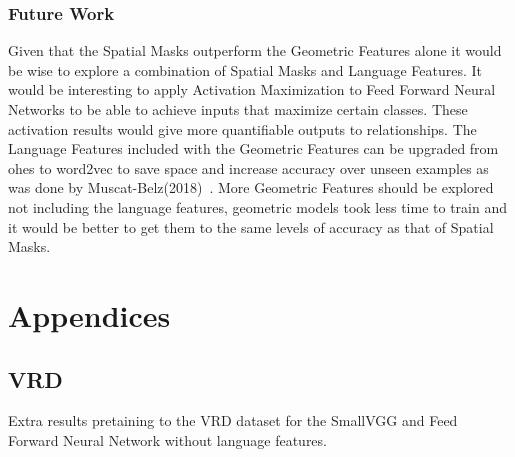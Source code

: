 \documentclass{csfyp}
\begin{document}
\subsubsection{Future Work}
Given that the Spatial Masks outperform the Geometric Features alone it would be wise to explore a combination of Spatial Masks and Language Features. It would be interesting to apply Activation Maximization to Feed Forward Neural Networks to be able to achieve inputs that maximize certain classes. These activation results would give more quantifiable outputs to relationships. The Language Features included with the Geometric Features can be upgraded from \Gls{ohe}s to word2vec to save space and increase accuracy over unseen examples as was done by Muscat-Belz(2018)~\cite{belz-etal-2018-spatialvoc2k}. More Geometric Features should be explored not including the language features, geometric models took less time to train and it would be better to get them to the same levels of accuracy as that of Spatial Masks.

\newpage
\section{Appendices}
\subsection{VRD}
Extra results pretaining to the VRD dataset for the SmallVGG and Feed Forward Neural Network without language features.
\end{document}
